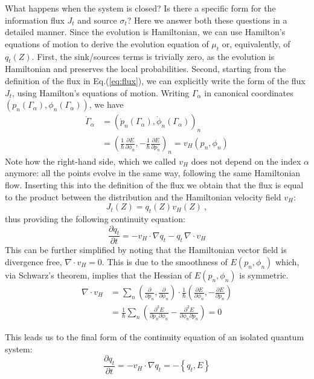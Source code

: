 \documentclass[draft,nofootinbib,pre,twocolumn,showpacs,showkeys,preprintnumbers,floatfix]{revtex4-1}
\newcommand{\1}{\mathbbm{1}}
\newcommand{\p}{\partial}
\begin{document}
What happens when the system is closed? Is there a specific form for the information flux $J_t$ and source $\sigma_t$?
Here we answer both these questions in a detailed manner. Since the evolution is Hamiltonian, we can 
use Hamilton's equations of motion to derive the evolution equation of $\mu_t$ or, equivalently, of $q_t(Z)$.
First, the sink/sources terms is trivially zero, as the evolution is Hamiltonian and preserves the local probabilities.
Second, starting from the definition of the flux in Eq.(\ref{eq:flux}), we can explicitly write the form of the flux $J_t$, 
using Hamilton's equations of motion. Writing $\Gamma_\alpha$ in canonical coordinates $(p_n(\Gamma_\alpha),\phi_n(\Gamma_\alpha))$, 
we have 
\begin{align}
\dot{\Gamma}_\alpha & = \left( \dot{p}_n(\Gamma_\alpha), \dot{\phi}_n(\Gamma_\alpha)\right)_n \nonumber \\
& = \left( \frac{1}{\hbar}\frac{\partial E}{\partial \phi_n}, -\frac{1}{\hbar}\frac{\partial E}{\partial p_n}  \right)_n = v_H(p_n,\phi_n)
\end{align}
Note how the right-hand side, which we called $v_H$ does not depend on the index $\alpha$ anymore: all 
the points evolve in the same way, following the same Hamiltonian flow. Inserting this into the definition of the flux 
we obtain that the flux is equal to the product between the distribution and the Hamiltonian velocity field $v_H$:
\begin{equation}
J_t(Z) = q_t(Z) v_H(Z)~,
\end{equation}
thus providing the following continuity equation:
\begin{equation}
\frac{\partial q_t}{\partial t} = - v_H \cdot \nabla q_t - q_t \, \nabla \cdot v_H
\end{equation}
This can be further simplified by noting that the Hamiltonian vector field is divergence free, $\nabla \cdot v_H = 0$.
This is due to the smoothness of $E(p_n,\phi_n)$ which, via Schwarz's theorem, implies that the Hessian of $E(p_n,\phi_n)$ 
is symmetric. 
\begin{align}
\nabla \cdot v_H &= \sum_n \left( \frac{\partial}{\partial p_n} , \frac{\partial}{\partial \phi_n}\right) \cdot \frac{1}{\hbar}\left(\frac{\p E}{\p \phi_n}, -\frac{\p E}{\p p_n} \right) \nonumber \\
& = \frac{1}{\hbar} \sum_n \left( \frac{\p^2 E}{\p p_n \p \phi_n } - \frac{\p^2 E}{\p \phi_n \p p_n }\right) = 0 \nonumber
\end{align}

This leads us to the final form of the continuity equation of an isolated quantum system:
\begin{equation}
\frac{\partial q_t}{\partial t} = - v_H \cdot \nabla q_t = -\left\{ q_t, E \right\}
\end{equation}
\end{document}
